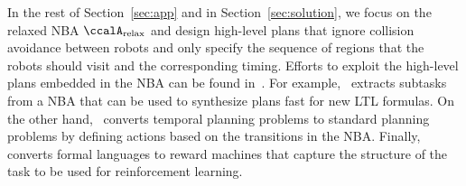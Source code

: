 \documentclass[Afour,sageh,times]{sagej}
\newcommand{\auto}[1]{\ccalA_{\text{#1}}}
\begin{document}
{In the rest of Section~\ref{sec:app} and in Section~\ref{sec:solution}, we focus on the relaxed NBA $\auto{relax}$ and design high-level plans that ignore collision avoidance between robots and only specify the sequence of regions that the robots should visit and the corresponding timing. Efforts to exploit the high-level plans embedded in the NBA can be found in~\cite{xluo_CDC19,camacho2017non,camacho2019ltl}. For example,~\cite{xluo_CDC19} extracts subtasks from a NBA that can be used to synthesize plans fast for new LTL formulas. On the other hand,~\cite{camacho2017non} converts temporal planning problems to standard planning problems by defining actions based on the transitions in the NBA. Finally,~\cite{camacho2019ltl} converts formal languages to reward machines that capture the structure of the task to be used for reinforcement learning.




}
\end{document}
